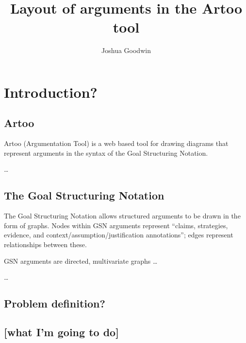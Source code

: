 \documentclass[authoryearcitations]{UoYCSproject}
\author{Joshua Goodwin}
\title{Layout of arguments in the Artoo tool}
\begin{document}
\maketitle





\chapter{Introduction?}

\section{Artoo}

Artoo (Argumentation Tool) is a web based tool for drawing diagrams that represent arguments
in the syntax of the Goal Structuring Notation.

\ldots

\section{The Goal Structuring Notation}

The Goal Structuring Notation allows structured arguments to be drawn in the form of graphs.
Nodes within GSN arguments represent ``claims, strategies, evidence, and context/assumption/justification annotations'';
edges represent relationships between these.

GSN arguments are directed, multivariate  graphs \ldots



\ldots



\section{Problem definition?}


\section{[what I'm going to do]}
\end{document}
